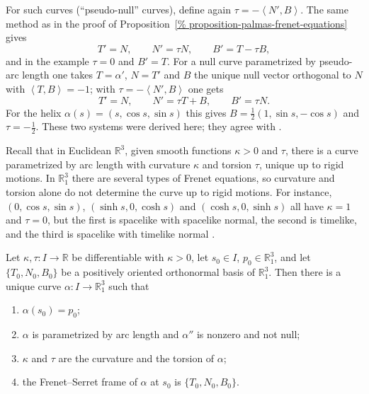 For such curves (``pseudo-null'' curves),
define again
$\tau=-\left\langle{} N',B \right\rangle{}$.
The same method as in the proof of
Proposition~\ref{%
proposition-palmas-frenet-equations}
gives
$$
T'=N,\qquad N'=\tau N,\qquad
B'=T-\tau B,
$$
and in the example $\tau=0$ and $B'=T$.
For a null curve parametrized by pseudo-arc
length one takes $T=\alpha'$, $N=T'$ and
$B$ the unique null vector orthogonal to $N$
with
$\left\langle{} T,B \right\rangle{}=-1$;
with
$\tau=-\left\langle{} N',B \right\rangle{}$
one gets
$$
T'=N,\qquad N'=\tau T+B,\qquad B'=\tau N.
$$
For the helix
$\alpha(s)=(s,\cos s,\sin s)$ this gives
$B=\tfrac12(1,\sin s,-\cos s)$ and
$\tau=-\tfrac12$. These two systems were
derived here; they agree with
\cite[Section 2.2]{lopez2014differential}.

\begin{remark}
\label{remark-palmas-no-uniqueness}
Recall that in Euclidean $\mathbb{R}^3$,
given smooth functions $\kappa>0$ and
$\tau$, there is a curve parametrized by
arc length with curvature $\kappa$ and
torsion $\tau$, unique up to rigid
motions. In $\mathbb{R}^3_1$ there are
several types of Frenet equations, so
curvature and torsion alone do not
determine the curve up to rigid motions.
For instance, $(0,\cos s,\sin s)$,
$(\sinh s,0,\cosh s)$ and
$(\cosh s,0,\sinh s)$ all have
$\kappa=1$ and $\tau=0$, but the first is
spacelike with spacelike normal, the
second is timelike, and the third is
spacelike with timelike normal
\cite[Section 2.2]{lopez2014differential}.
\end{remark}

\begin{theorem}
\label{theorem-palmas-fundamental-curves}
Let $\kappa,\tau\colon I\to\mathbb{R}$ be
differentiable with $\kappa>0$, let
$s_0\in I$, $p_0\in\mathbb{R}^3_1$, and
let $\{T_0,N_0,B_0\}$ be a positively
oriented orthonormal basis of
$\mathbb{R}^3_1$. Then there is a unique
curve $\alpha\colon I\to\mathbb{R}^3_1$
such that
\begin{enumerate}
\item $\alpha(s_0)=p_0$;
\item $\alpha$ is parametrized by arc
length and $\alpha''$ is nonzero and not
null;
\item $\kappa$ and $\tau$ are the
curvature and the torsion of $\alpha$;
\item the Frenet--Serret frame of $\alpha$
at $s_0$ is $\{T_0,N_0,B_0\}$.
\end{enumerate}
\end{theorem}

